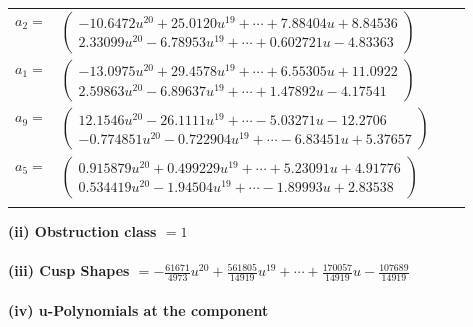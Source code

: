 \documentclass[1p]{elsarticle_modified}
\theoremstyle{definition}
\begin{document}
\begin{tabular}{m{7pt} m{180pt} m{7pt} m{180pt} }
\flushright $a_{2}=$&$\begin{pmatrix}-10.6472 u^{20}+25.0120 u^{19}+\cdots+7.88404 u+8.84536\\2.33099 u^{20}-6.78953 u^{19}+\cdots+0.602721 u-4.83363\end{pmatrix}$ \\
\flushright $a_{1}=$&$\begin{pmatrix}-13.0975 u^{20}+29.4578 u^{19}+\cdots+6.55305 u+11.0922\\2.59863 u^{20}-6.89637 u^{19}+\cdots+1.47892 u-4.17541\end{pmatrix}$ \\
\flushright $a_{9}=$&$\begin{pmatrix}12.1546 u^{20}-26.1111 u^{19}+\cdots-5.03271 u-12.2706\\-0.774851 u^{20}-0.722904 u^{19}+\cdots-6.83451 u+5.37657\end{pmatrix}$ \\
\flushright $a_{5}=$&$\begin{pmatrix}0.915879 u^{20}+0.499229 u^{19}+\cdots+5.23091 u+4.91776\\0.534419 u^{20}-1.94504 u^{19}+\cdots-1.89993 u+2.83538\end{pmatrix}$\\&\end{tabular}
\flushleft \textbf{(ii) Obstruction class $= 1$}\\~\\
\flushleft \textbf{(iii) Cusp Shapes $= -\frac{61671}{4973} u^{20}+\frac{561805}{14919} u^{19}+\cdots+\frac{170057}{14919} u-\frac{107689}{14919}$}\\~\\
\newpage\renewcommand{\arraystretch}{1}
\flushleft \textbf{(iv) u-Polynomials at the component}\newline \\
\end{document}
